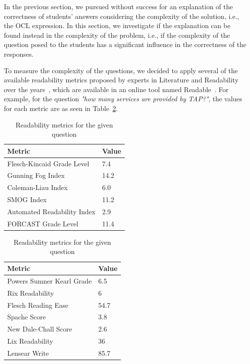 In the previous section, we pursued without success for an explanation of the correctness of students' answers considering the complexity of the solution, i.e., the OCL expression. In this section, we investigate if the explanation can be found instead in the complexity of the problem, i.e., if the complexity of the question posed to the students has a significant influence in the correctness of the responses.

To measure the complexity of the questions, we decided to apply several of the available readability metrics proposed by experts in Literature and Readability over the years~\cite{sanja2013}, which are available in an online tool named Readable~\cite{readable}. For example, for the question \textit{"how many services are provided by TAP?"}, the values for each metric are as seen in Table~\ref{tbl:nlMetricsTap}.

\begin{table}[h]
\centering
\caption{Readability metrics for the given question}
\label{tbl:nlMetricsTap}
\begin{tabular}{@{}ll@{}}
\toprule
Metric                      & Value \\ \midrule
Flesch-Kincaid Grade Level  & 7.4   \\
Gunning Fog Index            & 14.2  \\
Coleman-Liau Index          & 6.0   \\
SMOG Index                 & 11.2  \\
Automated Readability Index & 2.9   \\
FORCAST Grade Level         & 11.4  \\ \bottomrule
\end{tabular}
\quad
\begin{tabular}{@{}ll@{}}
\toprule
Metric                    & Value \\ \midrule
Powers Sumner Kearl Grade & 6.5   \\
Rix Readability           & 6     \\
Flesch Reading Ease       & 54.7  \\
Spache Score              & 3.8   \\
New Dale-Chall Score      & 2.6   \\
Lix Readability           & 36    \\
Lensear Write             & 85.7  \\ \bottomrule
\end{tabular}
\end{table}

